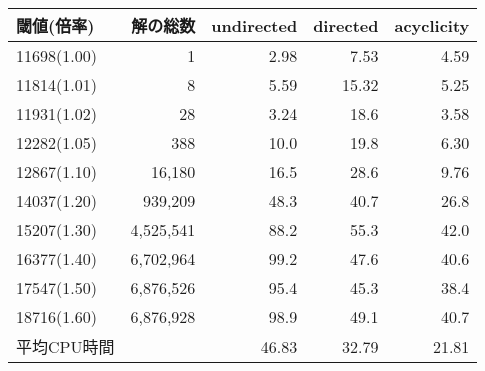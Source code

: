   \begin{tabular}{lr|rrr}
    閾値(倍率)    &	解の総数 & \textsf{undirected} & \textsf{directed} & \textsf{acyclicity} \\
    \hline
    11698(1.00)   &	1      &\alert{2.98} & 7.53 & 4.59	\\
    11814(1.01)   &	8      &5.59  & 15.32	& \alert{5.25}	\\
    11931(1.02)   &	28     &\alert{3.24}& 18.6	& 3.58	\\
    12282(1.05)   &	388    &10.0&19.8	& \alert{6.30}	\\
    12867(1.10)   &	16,180  &16.5& 28.6	& \alert{9.76}\\
    14037(1.20)   &	939,209 &48.3       &40.7	& \alert{26.8}\\
    15207(1.30)   &	4,525,541&88.2      &55.3	& \alert{42.0}\\
    16377(1.40)   &	6,702,964&99.2       &47.6	& \alert{40.6}	\\
    17547(1.50)   &	6,876,526&95.4       &45.3	& \alert{38.4}	\\
    18716(1.60)   &	6,876,928&98.9       &49.1	& \alert{40.7}	\\
    \hline
    平均CPU時間 &   & 46.83 & 32.79  & \alert{21.81}\\
  \end{tabular}
